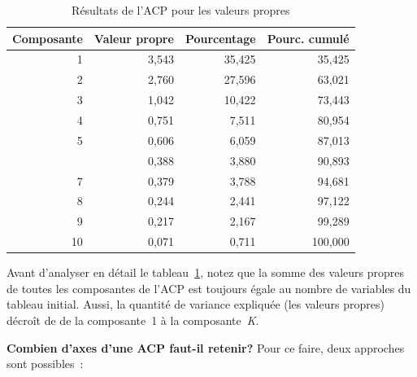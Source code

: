 \documentclass[
  11pt,
  french,
]{book}
\begin{document}
\begin{table}

\caption{\label{tab:dataacpValeurPropres}Résultats de l'ACP pour les valeurs propres}
\centering
\fontsize{8}{10}\selectfont
\begin{tabular}[t]{rrrr}
\toprule
Composante & Valeur propre & Pourcentage & Pourc. cumulé\\
\midrule
1 & 3,543 & 35,425 & 35,425\\
2 & 2,760 & 27,596 & 63,021\\
3 & 1,042 & 10,422 & 73,443\\
4 & 0,751 & 7,511 & 80,954\\
5 & 0,606 & 6,059 & 87,013\\
\addlinespace
6 & 0,388 & 3,880 & 90,893\\
7 & 0,379 & 3,788 & 94,681\\
8 & 0,244 & 2,441 & 97,122\\
9 & 0,217 & 2,167 & 99,289\\
10 & 0,071 & 0,711 & 100,000\\
\bottomrule
\end{tabular}
\end{table}

Avant d'analyser en détail le tableau~\ref{tab:dataacpValeurPropres}, notez que la somme des valeurs propres de toutes les composantes de l'ACP est toujours égale au nombre de variables du tableau initial. Aussi, la quantité de variance expliquée (les valeurs propres) décroît de de la composante~1 à la composante~\emph{K}.

\textbf{Combien d'axes d'une ACP faut-il retenir?} Pour ce faire, deux approches sont possibles~:
\end{document}
